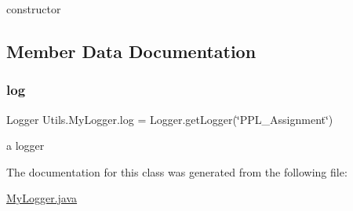 constructor 

\subsection{Member Data Documentation}
\mbox{\label{class_utils_1_1_my_logger_a1cfaca3077446ea78a1055d8b1154b0c}} 
\subsubsection{\texorpdfstring{log}{log}}
{\footnotesize\ttfamily Logger Utils.\+My\+Logger.\+log = Logger.\+get\+Logger(\char`\"{}P\+P\+L\+\_\+\+Assignment\char`\"{})}

a logger 

The documentation for this class was generated from the following file\+:\begin{DoxyCompactItemize}
\item 
\hyperlink{_my_logger_8java}{My\+Logger.\+java}\end{DoxyCompactItemize}
